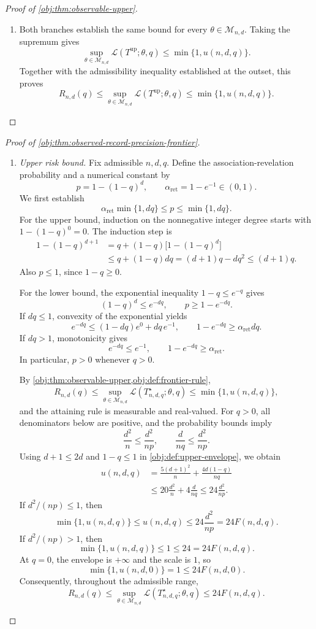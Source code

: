 \documentclass[11pt]{article}
\begin{document}
\begin{proof}[Proof of \cref{obj:thm:observable-upper}]
\begin{enumerate}
\item
Both branches establish the same bound for every \(\theta\in\mathcal M_{n,d}\). Taking the supremum gives
\[
\sup_{\theta\in\mathcal M_{n,d}}
\mathcal L(T^{\mathrm{up}};\theta,q)
\le\min\{1,u(n,d,q)\}.
\]
Together with the admissibility inequality established at the outset, this proves
\[
R_{n,d}(q)
\le
\sup_{\theta\in\mathcal M_{n,d}}
\mathcal L(T^{\mathrm{up}};\theta,q)
\le
\min\{1,u(n,d,q)\}.
\]
\end{enumerate}
\end{proof}

\begin{proof}[Proof of \cref{obj:thm:observed-record-precision-frontier}]
\begin{enumerate}
\item \textit{Upper risk bound.}
Fix admissible \(n,d,q\). Define the association-revelation probability and a numerical constant by
\[
p=1-(1-q)^d,
\qquad
\alpha_{\mathrm{ret}}=1-e^{-1}\in(0,1).
\]
We first establish
\[
\alpha_{\mathrm{ret}}\min\{1,dq\}\le p\le\min\{1,dq\}.
\]
For the upper bound, induction on the nonnegative integer degree starts with
\(1-(1-q)^0=0\). The induction step is
\[
\begin{aligned}
1-(1-q)^{d+1}
&=q+(1-q)\bigl[1-(1-q)^d\bigr]\\
&\le q+(1-q)dq
=(d+1)q-dq^2
\le(d+1)q.
\end{aligned}
\]
Also \(p\le1\), since \(1-q\ge0\).

For the lower bound, the exponential inequality \(1-q\le e^{-q}\) gives
\[
(1-q)^d\le e^{-dq},
\qquad
p\ge1-e^{-dq}.
\]
If \(dq\le1\), convexity of the exponential yields
\[
e^{-dq}\le(1-dq)e^0+dq\,e^{-1},
\qquad
1-e^{-dq}\ge\alpha_{\mathrm{ret}}dq.
\]
If \(dq>1\), monotonicity gives
\[
e^{-dq}\le e^{-1},
\qquad
1-e^{-dq}\ge\alpha_{\mathrm{ret}}.
\]
In particular, \(p>0\) whenever \(q>0\).

By \cref{obj:thm:observable-upper,obj:def:frontier-rule},
\[
R_{n,d}(q)
\le
\sup_{\theta\in\mathcal M_{n,d}}
\mathcal L(T^\star_{n,d,q};\theta,q)
\le\min\{1,u(n,d,q)\},
\]
and the attaining rule is measurable and real-valued. For \(q>0\), all denominators below are positive, and the probability bounds imply
\[
\frac{d^2}{n}\le\frac{d^2}{np},
\qquad
\frac{d}{nq}\le\frac{d^2}{np}.
\]
Using \(d+1\le2d\) and \(1-q\le1\) in
\cref{obj:def:upper-envelope}, we obtain
\[
\begin{aligned}
u(n,d,q)
&=\frac{5(d+1)^2}{n}+\frac{4d(1-q)}{nq}\\
&\le20\frac{d^2}{n}+4\frac{d}{nq}
\le24\frac{d^2}{np}.
\end{aligned}
\]
If \(d^2/(np)\le1\), then
\[
\min\{1,u(n,d,q)\}
\le u(n,d,q)
\le24\frac{d^2}{np}
=24F(n,d,q).
\]
If \(d^2/(np)>1\), then
\[
\min\{1,u(n,d,q)\}\le1\le24=24F(n,d,q).
\]
At \(q=0\), the envelope is \(+\infty\) and the scale is \(1\), so
\[
\min\{1,u(n,d,0)\}=1\le24F(n,d,0).
\]
Consequently, throughout the admissible range,
\[
R_{n,d}(q)
\le
\sup_{\theta\in\mathcal M_{n,d}}
\mathcal L(T^\star_{n,d,q};\theta,q)
\le24F(n,d,q).
\]


\end{enumerate}
\end{proof}
\end{document}
